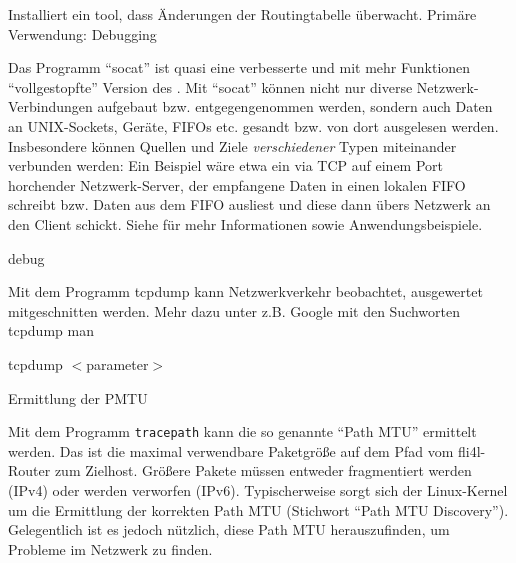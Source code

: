 \begin{description}
        Installiert ein tool, dass Änderungen der Routingtabelle
        überwacht. Primäre Verwendung: Debugging


    Das Programm ``socat'' ist quasi eine verbesserte und mit mehr Funktionen
    ``vollgestopfte'' Version des . Mit
    ``socat'' können nicht nur diverse Netzwerk-Verbindungen aufgebaut bzw.
    entgegengenommen werden, sondern auch Daten an UNIX-Sockets, Geräte,
    FIFOs etc. gesandt bzw. von dort ausgelesen werden. Insbesondere können
    Quellen und Ziele \emph{verschiedener} Typen miteinander verbunden werden:
    Ein Beispiel wäre etwa ein via TCP auf einem Port horchender
    Netzwerk-Server, der empfangene Daten in einen lokalen FIFO schreibt bzw.
    Daten aus dem FIFO ausliest und diese dann übers Netzwerk an den Client
    schickt. Siehe 
    für mehr Informationen sowie Anwendungsbeispiele.

 debug

    Mit dem Programm tcpdump kann Netzwerkverkehr beobachtet, ausgewertet
    mitgeschnitten werden. Mehr dazu unter z.B. Google mit den Suchworten
    \grqq{}tcpdump man\grqq{}

    tcpdump $<$parameter$>$

 Ermittlung der PMTU

    Mit dem Programm \texttt{tracepath} kann die so
    genannte ``Path MTU'' ermittelt werden. Das ist die maximal verwendbare
    Paketgröße auf dem Pfad vom fli4l-Router zum Zielhost. Größere Pakete
    müssen entweder fragmentiert werden (IPv4) oder werden verworfen (IPv6).
    Typischerweise sorgt sich der Linux-Kernel um die Ermittlung der korrekten
    Path MTU (Stichwort ``Path MTU Discovery''). Gelegentlich ist es jedoch
    nützlich, diese Path MTU herauszufinden, um Probleme im Netzwerk zu finden.
    

\end{description}
